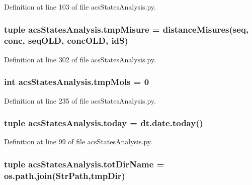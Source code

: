 Definition at line 103 of file acs\-States\-Analysis.\-py.

\hypertarget{a00104_a45529ce20ca353ca8ac251b4e88c91ff}{
\subsubsection[{tmp\-Misure}]{\setlength{\rightskip}{0pt plus 5cm}tuple acs\-States\-Analysis.\-tmp\-Misure = {\bf distance\-Misures}({\bf seq}, {\bf conc}, {\bf seq\-O\-L\-D}, {\bf conc\-O\-L\-D}, id\-S)}}\label{a00104_a45529ce20ca353ca8ac251b4e88c91ff}


Definition at line 302 of file acs\-States\-Analysis.\-py.

\hypertarget{a00104_aa24f8efad70335a8460f68902001ce64}{
\subsubsection[{tmp\-Mols}]{\setlength{\rightskip}{0pt plus 5cm}int acs\-States\-Analysis.\-tmp\-Mols = 0}}\label{a00104_aa24f8efad70335a8460f68902001ce64}


Definition at line 235 of file acs\-States\-Analysis.\-py.

\hypertarget{a00104_ac99ee9d8196d8a2305b9f4c795b23b97}{
\subsubsection[{today}]{\setlength{\rightskip}{0pt plus 5cm}tuple acs\-States\-Analysis.\-today = dt.\-date.\-today()}}\label{a00104_ac99ee9d8196d8a2305b9f4c795b23b97}


Definition at line 99 of file acs\-States\-Analysis.\-py.

\hypertarget{a00104_af4bd99f6cdaec32f48ed0074208b4f0c}{
\subsubsection[{tot\-Dir\-Name}]{\setlength{\rightskip}{0pt plus 5cm}tuple acs\-States\-Analysis.\-tot\-Dir\-Name = os.\-path.\-join({\bf Str\-Path},tmp\-Dir)}}\label{a00104_af4bd99f6cdaec32f48ed0074208b4f0c}



